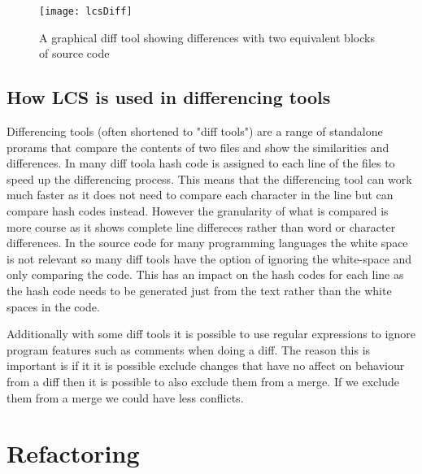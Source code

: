 \begin{figure}[h]
\begin{center}
\texttt{[image: lcsDiff]}
\end{center}
 \caption{A graphical diff tool showing differences with two equivalent blocks of source code}
\end{figure}

\subsection{How LCS is used in differencing tools}
Differencing tools (often shortened to "diff tools") are a range of standalone prorams that compare the contents of two files and show the similarities and differences.
In many diff toola hash code is assigned to each line of the files to speed up the differencing process.
This means that the differencing tool can work much faster as it does not need to compare each character in the line but can compare hash codes instead.
However the granularity of what is compared is more course as it shows complete line differeces rather than word or character differences. 
In the source code for many programming languages the white space is not relevant so many diff tools have the option of ignoring the white-space and only comparing the code.
This has an impact on the hash codes for each line as the hash code needs to be generated just from the text rather than the white spaces in the code.

Additionally with some diff tools it is possible to use regular expressions to ignore program features such as comments when doing a diff.  The reason this is important is if it it is possible exclude changes that have no affect on behaviour from a diff then it is possible to also exclude them from a merge.  If we exclude them from a merge we could have less conflicts.
 

\section{Refactoring}

